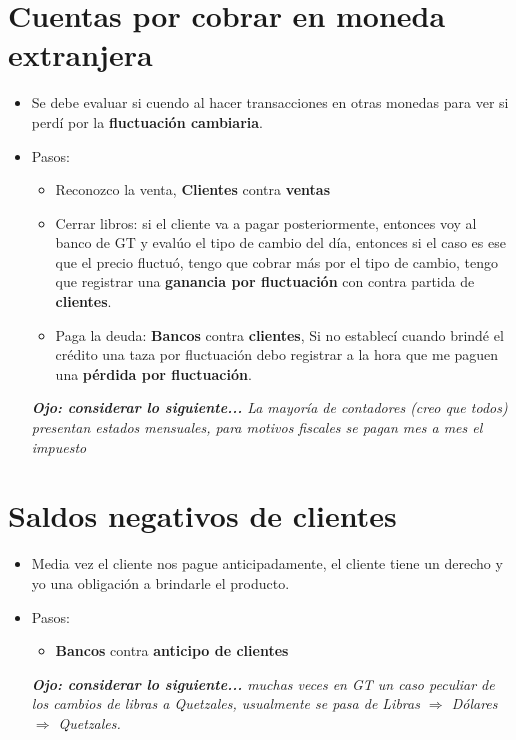 \section{Cuentas por cobrar en moneda extranjera}
\begin{itemize}
    \item Se debe evaluar si cuendo al hacer transacciones en otras monedas para ver si perdí por la \textbf{fluctuación cambiaria}.
    \item Pasos:
    \begin{itemize}
        \item Reconozco la venta, \textbf{Clientes} contra \textbf{ventas}
        \item Cerrar libros: si el cliente va a pagar posteriormente, entonces voy al banco de GT y evalúo el tipo de cambio del día, entonces si el caso es ese que el precio fluctuó, tengo que cobrar más por el tipo de cambio, tengo que registrar una \textbf{ganancia por fluctuación} con contra partida de \textbf{clientes}.
        \item Paga la deuda: \textbf{Bancos} contra \textbf{clientes}, Si no establecí cuando brindé el crédito una taza por fluctuación debo registrar a la hora que me paguen una \textbf{pérdida por fluctuación}.
    \end{itemize}
    \emph{\textbf{Ojo: considerar lo siguiente...} La mayoría de contadores (creo que todos) presentan estados mensuales, para motivos fiscales se pagan mes a mes el impuesto }
\end{itemize}

\section{Saldos negativos de clientes}
\begin{itemize}
    \item Media vez el cliente nos pague anticipadamente, el cliente tiene un derecho y yo una obligación a brindarle el producto.
    \item Pasos:
    \begin{itemize}
        \item \textbf{Bancos} contra \textbf{anticipo de clientes} 
    \end{itemize}
    \emph{\textbf{Ojo: considerar lo siguiente...} muchas veces en GT un caso peculiar de los cambios de libras a Quetzales, usualmente se pasa de Libras $\Rightarrow $ Dólares $\Rightarrow $ Quetzales.}
\end{itemize}

